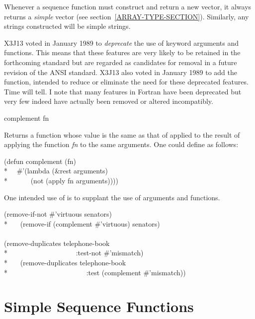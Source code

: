 Whenever a sequence function must construct and return
a new vector, it always returns a \emph{simple}
vector (see section~\ref{ARRAY-TYPE-SECTION}).
Similarly, any strings constructed will be simple strings.

\begin{new}
X3J13 voted in January 1989
to \emph{deprecate} the use of  keyword arguments
and  functions. This means that these features are very
likely to be retained in the forthcoming standard but are regarded as
candidates for removal in a future revision of the ANSI standard.
X3J13 also voted in January 1989
to add the  function, intended to reduce or eliminate the
need for these deprecated features.  Time will tell.  I note that
many features in Fortran have been deprecated but very few indeed
have actually been removed or altered incompatibly.

\begin{defun}[Function]
complement fn

Returns a function whose value is the same as that of 
applied to the result of applying the function \emph{fn} to the same
arguments.  One could define  as follows:
\begin{lisp}
(defun complement (fn) \\*
~~\#'(lambda (\&rest arguments) \\*
~~~~~~(not (apply fn arguments))))
\end{lisp}

One intended use of  is to supplant the use of
 arguments and  functions.
\begin{lisp}
(remove-if-not \#'virtuous senators) {\EQ} \\*
~~~(remove-if (complement \#'virtuous) senators) \\
\\
(remove-duplicates telephone-book \\*
~~~~~~~~~~~~~~~~~~~:test-not \#'mismatch) {\EQ} \\*
~~~(remove-duplicates telephone-book \\*
~~~~~~~~~~~~~~~~~~~~~~:test (complement \#'mismatch))
\end{lisp}
\end{defun}
\end{new}

\section{Simple Sequence Functions}

